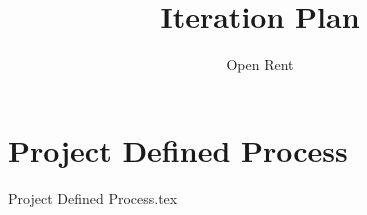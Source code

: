 \documentclass[a4paper,11pt]{book}
\title{Iteration Plan}
\author{Open Rent}
\begin{document}
\chapter{Project Defined Process}
{Project Defined Process.tex}
\end{document}

